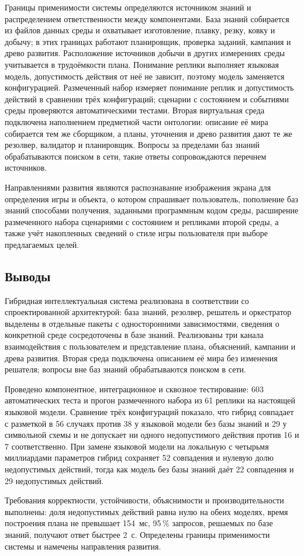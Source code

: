 Границы применимости системы определяются источником знаний и распределением
ответственности между компонентами. База знаний собирается из файлов данных среды и
охватывает изготовление, плавку, резку, ковку и добычу; в этих границах работают
планировщик, проверка заданий, кампания и древо развития. Расположение источников добычи
в других измерениях среды учитывается в трудоёмкости плана. Понимание реплики выполняет
языковая модель, допустимость действия от неё не зависит, поэтому модель заменяется
конфигурацией. Размеченный набор измеряет понимание реплик и допустимость действий в
сравнении трёх конфигураций; сценарии с состоянием и событиями среды проверяются
автоматическими тестами. Вторая виртуальная среда подключена наполнением предметной части
онтологии: описание её мира собирается тем же сборщиком, а планы, уточнения и древо
развития дают те же резолвер, валидатор и планировщик. Вопросы за пределами баз знаний
обрабатываются поиском в сети, такие ответы сопровождаются перечнем источников.

Направлениями развития являются распознавание изображения экрана для определения игры
и объекта, о котором спрашивает пользователь, пополнение баз знаний способами
получения, заданными программным кодом среды, расширение размеченного набора
сценариями с состоянием и репликами второй среды, а также учёт накопленных сведений о
стиле игры пользователя при выборе предлагаемых целей.

\subsection{Выводы}

Гибридная интеллектуальная система реализована в соответствии со спроектированной
архитектурой: база знаний, резолвер, решатель и оркестратор выделены в отдельные
пакеты с односторонними зависимостями, сведения о конкретной среде сосредоточены в
базе знаний. Реализованы три канала взаимодействия с пользователем и представление
плана, объяснений, кампании и древа развития. Вторая среда подключена описанием её мира без
изменения решателя; вопросы вне баз знаний обрабатываются поиском в сети.

Проведено компонентное, интеграционное и сквозное тестирование: 603 автоматических
теста и прогон размеченного набора из 61 реплики на настоящей языковой модели.
Сравнение трёх конфигураций показало, что гибрид совпадает с разметкой в 56 случаях
против 38 у языковой модели без базы знаний и 29 у символьной схемы и не допускает ни
одного недопустимого действия против 16 и 7 соответственно. При замене языковой
модели на локальную с четырьмя миллиардами параметров гибрид сохраняет 52 совпадения и
нулевую долю недопустимых действий, тогда как модель без базы знаний даёт 22 совпадения
и 29 недопустимых действий.

Требования корректности, устойчивости, объяснимости и производительности выполнены: доля
недопустимых действий равна нулю на обеих моделях, время построения плана не превышает
154~мс, 95\,\% запросов, решаемых по базе знаний, получают ответ быстрее 2~с. Определены границы
применимости системы и намечены направления развития.
